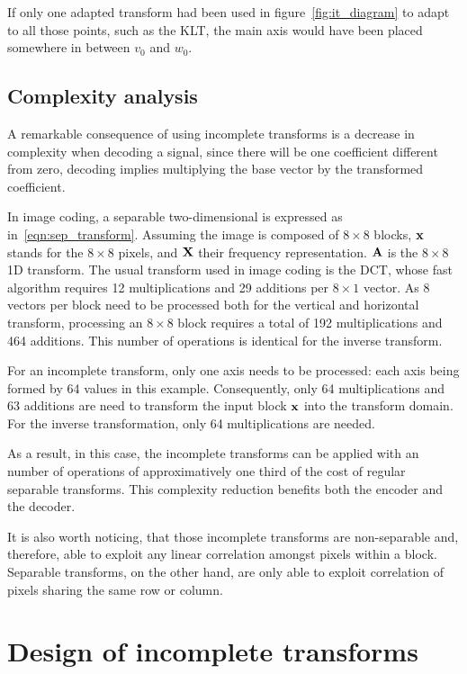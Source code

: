 \documentclass[11pt,a4paper,openright,twoside]{book}
\numberwithin{equation}{section} %
\numberwithin{figure}{section} %
\numberwithin{table}{section} %
\begin{document}
If only one adapted transform had been used in figure~\ref{fig:it_diagram}
to adapt to all those points, such as the \acl{KLT}, the main axis would have
been placed somewhere in between $v_0$ and $w_0$.

\subsection{Complexity analysis}
\label{sub:it_complexity_analysis}

A remarkable consequence of using incomplete transforms is a decrease in
complexity when decoding a signal, since there will be one coefficient
different from zero, decoding implies multiplying the base vector by the
transformed coefficient.

In image coding, a separable two-dimensional is expressed as
in~\eqref{eqn:sep_transform}.
Assuming the image is composed of $8\times8$ blocks, $\mathbf{x}$ stands for the
$8\times8$ pixels, and $\mathbf{X}$ their frequency representation.
$\mathbf{A}$ is the $8\times8$ 1D transform.
The usual transform used in image coding is the \ac{DCT}, whose fast algorithm
requires 12 multiplications and 29 additions per $8\times1$ vector.
As $8$ vectors per block need to be processed both for the vertical and
horizontal transform, processing an $8\times8$ block requires a total of 192
multiplications and 464 additions.
This number of operations is identical for the inverse transform.

For an incomplete transform, only one axis needs to be processed:
each axis being formed by 64 values in this example.
Consequently, only 64 multiplications and 63 additions are need to transform
the input block $\mathbf{x}$ into the transform domain.
For the inverse transformation, only 64 multiplications are needed.

As a result, in this case, the incomplete transforms can be applied with an
number of operations of approximatively one third of the cost of regular
separable transforms.
This complexity reduction benefits both the encoder and the decoder.

It is also worth noticing, that those incomplete transforms are non-separable
and, therefore, able to exploit any linear correlation amongst pixels
within a block.
Separable transforms, on the other hand, are only able to exploit correlation
of pixels sharing the same row or column.

\section{Design of incomplete transforms}
\label{sec:it_design_of_incomplete_transforms}
\end{document}
